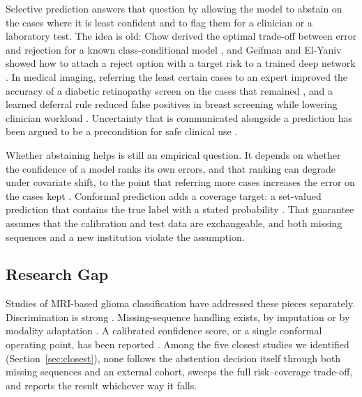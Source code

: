 \documentclass[journal]{IEEEtran}
\begin{document}
Selective prediction answers that question by allowing the model to abstain on the cases where it is least confident and to flag them for a clinician or a laboratory test. The idea is old: Chow derived the optimal trade-off between error and rejection for a known class-conditional model \cite{chow1970}, and Geifman and El-Yaniv showed how to attach a reject option with a target risk to a trained deep network \cite{geifman2017}. In medical imaging, referring the least certain cases to an expert improved the accuracy of a diabetic retinopathy screen on the cases that remained \cite{leibig2017}, and a learned deferral rule reduced false positives in breast screening while lowering clinician workload \cite{dvijotham2023}. Uncertainty that is communicated alongside a prediction has been argued to be a precondition for safe clinical use \cite{begoli2019,kompa2021}.

Whether abstaining helps is still an empirical question. It depends on whether the confidence of a model ranks its own errors, and that ranking can degrade under covariate shift, to the point that referring more cases increases the error on the cases kept \cite{srivastava2023}. Conformal prediction adds a coverage target: a set-valued prediction that contains the true label with a stated probability \cite{vovk2005,angelopoulos2023}. That guarantee assumes that the calibration and test data are exchangeable, and both missing sequences and a new institution violate the assumption.

\subsection{Research Gap}
Studies of MRI-based glioma classification have addressed these pieces separately. Discrimination is strong \cite{farahani2025}. Missing-sequence handling exists, by imputation or by modality adaptation \cite{liang2026risen,liu2026gmmas}. A calibrated confidence score, or a single conformal operating point, has been reported \cite{yogananda2025,elyassirad2026}. Among the five closest studies we identified (Section~\ref{sec:closest}), none follows the abstention decision itself through both missing sequences and an external cohort, sweeps the full risk--coverage trade-off, and reports the result whichever way it falls.
\end{document}

